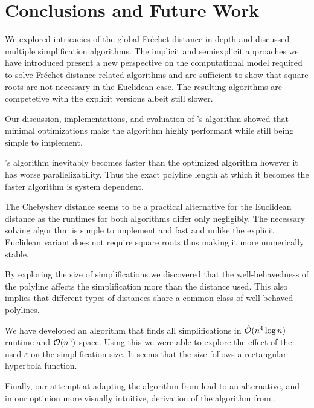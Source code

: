 \section{Conclusions and Future Work}
\label{sec:discussion_conclusion}

We explored intricacies of the global Fréchet distance in depth and discussed multiple simplification algorithms. 
The implicit and semiexplicit approaches we have introduced present a new perspective on the computational model required to solve Fréchet distance related algorithms and are sufficient to show that square roots are not necessary in the Euclidean case. The resulting algorithms are competetive with the explicit versions albeit still slower.

Our discussion, implementations, and evaluation of \citeauthor{on_optimal_polyline_simplification_using_the_hausdorff_and_frechet_distance}'s algorithm showed that minimal optimizations make the algorithm highly performant while still being simple to implement. 

\citeauthor{polyline_simplification_has_cubic_complexity_bringmannetal}'s algorithm inevitably becomes faster than the optimized \citeauthor{on_optimal_polyline_simplification_using_the_hausdorff_and_frechet_distance} algorithm however it has worse parallelizability. Thus the exact polyline length at which it becomes the faster algorithm is system dependent. 

The Chebyshev distance seems to be a practical alternative for the Euclidean distance as the runtimes for both algorithms differ only negligibly. The necessary solving algorithm is simple to implement and fast and unlike the explicit Euclidean variant does not require square roots thus making it more numerically stable. 

By exploring the size of simplifications we discovered that the well-behavedness of the polyline affects the simplification more than the distance used. This also implies that different types of distances share a common class of well-behaved polylines. 

We have developed an algorithm that finds all simplifications in \(\hat{\mathcal{O}}(n^4\log n)\) runtime and \(\mathcal{O}(n^3)\) space. Using this we were able to explore the effect of the used \(\varepsilon\) on the simplification size. It seems that the size follows a rectangular hyperbola function.

Finally, our attempt at adapting the algorithm from \citeauthor{computational_geometric_methods_for_polygonal_approximations_of_a_curve} lead to an alternative, and in our optinion more visually intuitive, derivation of the algorithm from \citeauthor{global_curve_simplification}.

